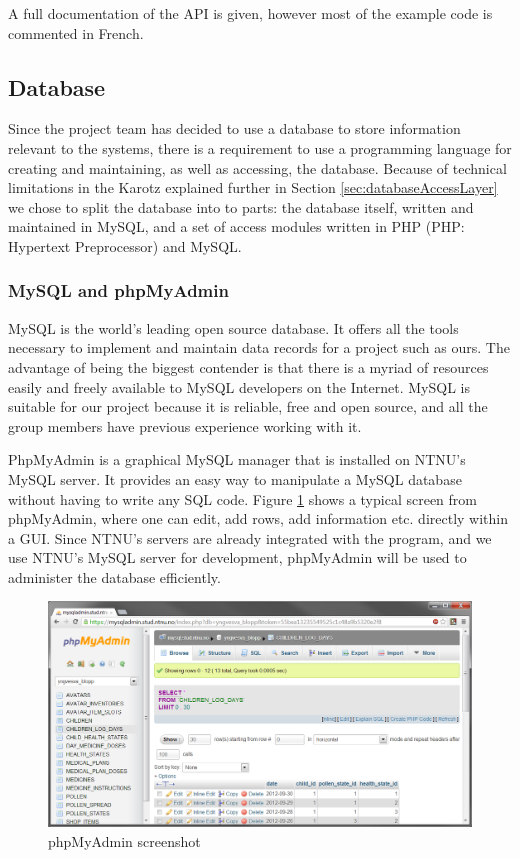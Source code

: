 A full documentation of the API is given, however most of the example code is commented in French.

\subsection{Database}
Since the project team has decided to use a database to store information relevant to the systems, there
is a requirement to use a programming language for creating and maintaining, as well as accessing, the
database. Because of technical limitations in the Karotz explained further in Section \ref{sec:databaseAccessLayer}
we chose to split the database into to parts: the database itself, written and maintained in MySQL, and
a set of access modules written in PHP (PHP: Hypertext Preprocessor) and MySQL.

\subsubsection{MySQL and phpMyAdmin}
MySQL\cite{mysql} is the world's leading open source database. It offers all the tools necessary to implement
and maintain data records for a project such as ours. The advantage of being the biggest contender is that there
is a myriad of resources easily and freely available to MySQL developers on the Internet. MySQL is suitable
for our project because it is reliable, free and open source, and all the group members have previous experience
working with it.

PhpMyAdmin is a graphical MySQL manager that is installed on NTNU's MySQL server\cite{ntnuphpmyadmin}. It provides
an easy way to manipulate a MySQL database without having to write any SQL code. Figure \ref{fig:phpmyadmin} shows
a typical screen from phpMyAdmin, where one can edit, add rows, add information etc. directly within a GUI. Since
NTNU's servers are already integrated with the program, and we use NTNU's MySQL server for development,
phpMyAdmin will be used to administer the database efficiently.

\begin{figure}
	\begin{center}
		\includegraphics[width=17.5cm]{Pictures/Tools/PhpMyAdmin}
	\end{center}
	\caption{phpMyAdmin screenshot}
	\label{fig:phpmyadmin}
\end{figure}

